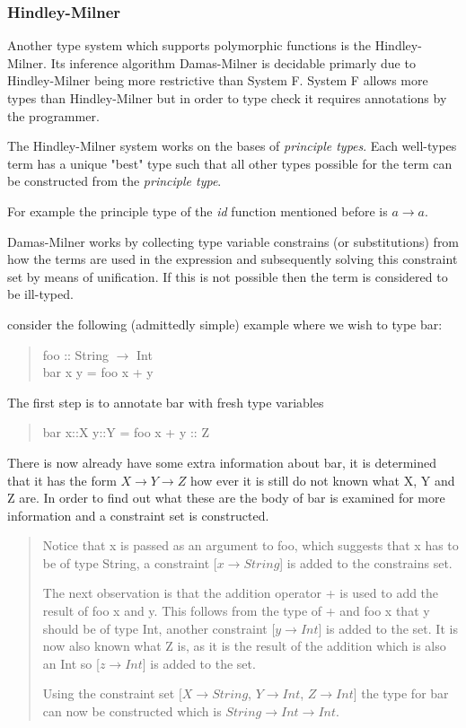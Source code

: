 \documentclass[12pt, a4paper, oneside]{article}
\begin{document}
\subsubsection{Hindley-Milner}
Another type system which supports polymorphic functions is the Hindley-Milner. Its inference algorithm Damas-Milner is decidable primarly due to Hindley-Milner being more restrictive than System F. System F allows more types than Hindley-Milner but in order to type check it requires annotations by the programmer.

The Hindley-Milner system works on the bases of \textit{principle types}. Each well-types term has a unique "best" type such that all other types possible for the term can be constructed from the \textit{principle type}. 

For example the principle type of the \textit{id} function mentioned before is $a \rightarrow a$.

Damas-Milner works by collecting type variable constrains (or substitutions) from how the terms are used in the expression and subsequently solving this constraint set by means of unification. If this is not possible then the term is considered to be ill-typed.

consider the following (admittedly simple) example where we wish to type bar:
\begin{quotation}
foo :: String $\rightarrow$ Int\\
\indent bar x y = foo x + y
\end{quotation}

The first step is to annotate bar with fresh type variables 
\begin{quotation}
bar x::X y::Y = foo x + y :: Z
\end{quotation}

There is now already have some extra information about bar, it is determined that it has the form $X \rightarrow Y \rightarrow Z$ 
how ever it is still do not known what X, Y and Z are. In order to find out what these are the body of bar is examined for more information and a constraint set is constructed.

\begin{quotation}
Notice that x is passed as an argument to foo, which suggests that x has to be of type String, a constraint [$x\rightarrow String$] is added to the constrains set.

The next observation is that the addition operator + is used to add the result of foo x and y. This follows from the type of + and foo x that y should be of type Int, another constraint [$y\rightarrow Int$] is added to the set. It is now also known what Z is, as it is the result of the addition which is also an Int so [$z\rightarrow Int$] is added to the set.

Using the constraint set {$[X\rightarrow String$, $Y\rightarrow Int$, $Z\rightarrow Int$]} the type for bar can now be constructed which is $String \rightarrow Int \rightarrow Int$.
\end{quotation}
\end{document}

